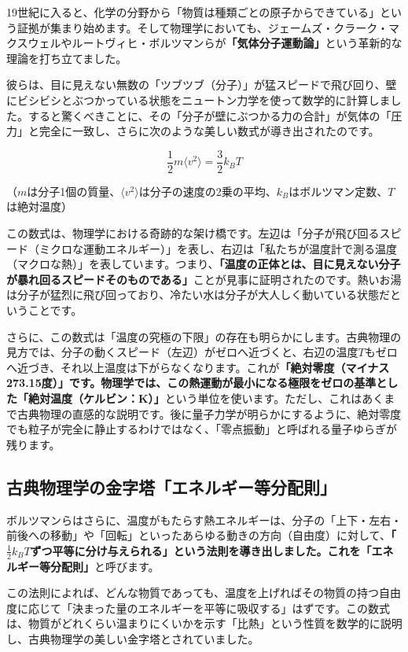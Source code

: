 19世紀に入ると、化学の分野から「物質は種類ごとの原子からできている」という証拠が集まり始めます。そして物理学においても、ジェームズ・クラーク・マクスウェルやルートヴィヒ・ボルツマンらが\textbf{「気体分子運動論」}という革新的な理論を打ち立てました。

彼らは、目に見えない無数の「ツブツブ（分子）」が猛スピードで飛び回り、壁にビシビシとぶつかっている状態をニュートン力学を使って数学的に計算しました。すると驚くべきことに、その「分子が壁にぶつかる力の合計」が気体の「圧力」と完全に一致し、さらに次のような美しい数式が導き出されたのです。

\[\frac{1}{2} m \langle v^2 \rangle = \frac{3}{2} k_B T\]

（\(m\)は分子1個の質量、\(\langle v^2 \rangle\)は分子の速度の2乗の平均、\(k_B\)はボルツマン定数、\(T\)は絶対温度）

この数式は、物理学における奇跡的な架け橋です。左辺は「分子が飛び回るスピード（ミクロな運動エネルギー）」を表し、右辺は「私たちが温度計で測る温度（マクロな熱）」を表しています。つまり、\textbf{「温度の正体とは、目に見えない分子が暴れ回るスピードそのものである」}ことが見事に証明されたのです。熱いお湯は分子が猛烈に飛び回っており、冷たい水は分子が大人しく動いている状態だということです。

さらに、この数式は「温度の究極の下限」の存在も明らかにします。古典物理の見方では、分子の動くスピード（左辺）がゼロへ近づくと、右辺の温度\(T\)もゼロへ近づき、それ以上温度は下がらなくなります。これが\textbf{「絶対零度（マイナス273.15度）」です。物理学では、この熱運動が最小になる極限をゼロの基準とした「絶対温度（ケルビン：K）」}という単位を使います。ただし、これはあくまで古典物理の直感的な説明です。後に量子力学が明らかにするように、絶対零度でも粒子が完全に静止するわけではなく、「零点振動」と呼ばれる量子ゆらぎが残ります。

\subsection{古典物理学の金字塔「エネルギー等分配則」}

ボルツマンらはさらに、温度がもたらす熱エネルギーは、分子の「上下・左右・前後への移動」や「回転」といったあらゆる動きの方向（自由度）に対して、\textbf{「\(\frac{1}{2} k_B T\)ずつ平等に分け与えられる」という法則を導き出しました。これを「エネルギー等分配則」}と呼びます。

この法則によれば、どんな物質であっても、温度を上げればその物質の持つ自由度に応じて「決まった量のエネルギーを平等に吸収する」はずです。この数式は、物質がどれくらい温まりにくいかを示す「比熱」という性質を数学的に説明し、古典物理学の美しい金字塔とされていました。

